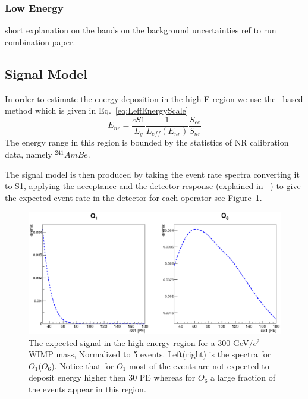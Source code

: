 \subsubsection{Low Energy}
\label{subsubsec:LowE}
short explanation on the bands on the background  uncertainties ref to run combination paper.


\subsection{Signal Model}
\label{subsec:SignalModel}
In order to estimate the energy deposition in the high E region we use the \Leff\ based method which is given in Eq.~\ref{eq:LeffEnergyScale}
\begin{equation}
\label{eq:LeffEnergyScale}
	E_{nr} = \frac{cS1}{L_y} \frac{1}{L_{eff}(E_{nr})} \frac{S_{ee}}{S_{nr}}
\end{equation}
The energy range in this region is bounded by the statistics of NR calibration data, namely $^{241}AmBe$.

The signal model is then produced by taking the event rate spectra converting it to S1, applying the acceptance and the detector response (explained in ~\cite{xe100_ana2012}) to give the expected event rate in the detector for each operator see Figure~\ref{fig:HighE}.
\begin{figure}[h!]
\begin{minipage}{1.\linewidth}
\centerline{\includegraphics[width=1.\linewidth]{Figures/SigHighO1O6.eps}}
\end{minipage}
\caption{The expected signal in the high energy region for a 300 GeV/$c^2$ WIMP mass, Normalized to 5 events. Left(right) is the spectra for $O_1$($O_6$). Notice that for $O_1$ most of the events are not expected to deposit energy higher then 30 PE whereas for $O_6$ a large fraction of the events appear in this region.}
\label{fig:HighE}
\end{figure} 




